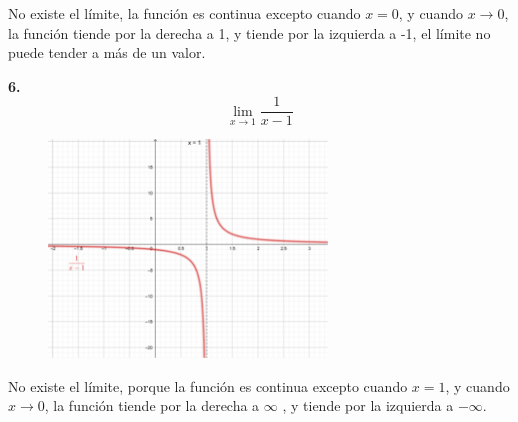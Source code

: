 \documentclass[12pt, letterpaper]{article}
\begin{document}
No existe el límite, la función es continua excepto cuando $x = 0$, y cuando  $x \to 0$, la función tiende por la derecha a 1, y tiende por la izquierda a -1, el límite no puede tender a más de un valor.

\textbf{6.} \[ \lim_{x \to 1} \frac{1}{x - 1}\]

\begin{figure}[ht]
\centering
\includegraphics[width=20em]{t8cinco}
\end{figure}

No existe el límite, porque la función es continua excepto cuando $x = 1$, y cuando  $x \to 0$, la función tiende por la derecha a $\infty$ , y tiende por la izquierda a $-\infty$.
\end{document}
